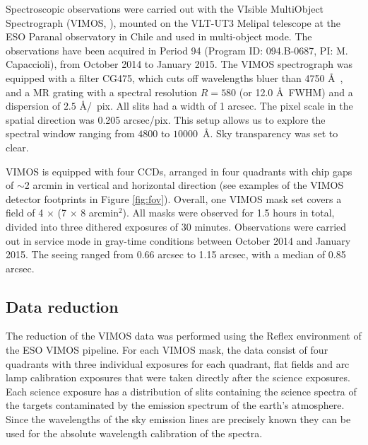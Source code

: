 \documentclass[useAMS,usenatbib]{mn2e}
\begin{document}
Spectroscopic observations were carried out with the VIsible MultiObject 
Spectrograph (VIMOS, \citealt{LeFevre}), mounted on the VLT-UT3 Melipal 
telescope at the ESO Paranal observatory in Chile and used in multi-object 
mode. The observations have been acquired in Period 94 (Program ID: 094.B-0687, 
PI: M. Capaccioli), from October 2014 to January 2015. 
The VIMOS spectrograph was equipped with a filter CG475, which cuts off 
wavelengths bluer than 4750 \AA\ , and a MR grating with a spectral resolution 
$R = 580$ (or 12.0 \AA\ FWHM) 
and a dispersion of $2.5$ \AA /~pix. All slits had a width of 1 arcsec. The 
pixel scale in the spatial direction was 0.205 arcsec/pix. This setup allows us 
to explore the spectral window ranging from $4800$ to $10000$~\AA. Sky 
transparency was set to clear.

VIMOS is equipped with four CCDs, arranged in four quadrants with chip gaps of 
$\sim$2 arcmin in vertical and horizontal direction (see examples of the VIMOS 
detector footprints in Figure \ref{fig:fov}). Overall, one VIMOS mask set 
covers a field of 4 $\times$ (7 $\times$ 8 arcmin$^2$). All masks were observed 
for 1.5 hours in total, divided into three dithered exposures of 30 minutes. 
Observations were carried out in service mode in gray-time conditions between 
October 2014 and January 2015. The seeing ranged from 0.66 arcsec to 1.15 
arcsec, with a median of 0.85 arcsec. 

\subsection{Data reduction}

The reduction of the VIMOS data was performed using the Reflex 
environment \citep{Freudling13} of the ESO VIMOS pipeline. 
For each VIMOS mask, the data consist of four 
quadrants with three individual exposures for each quadrant, flat fields and
arc lamp calibration exposures that were taken directly after the science 
exposures. Each science exposure has a distribution of slits containing the 
science spectra of the targets contaminated by the emission spectrum of the 
earth's atmosphere. Since the wavelengths of the sky emission lines are 
precisely known they can be used for the absolute wavelength calibration of 
the spectra.
\end{document}
